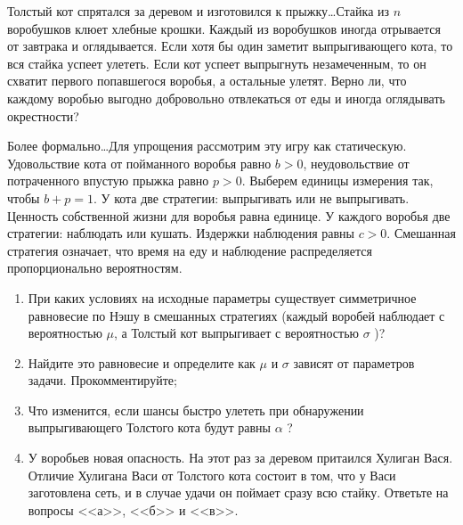 \begin{problem}
Толстый кот спрятался за деревом и изготовился к прыжку\ldots Стайка из  $n$  воробушков клюет хлебные крошки. Каждый из воробушков иногда отрывается от завтрака и оглядывается. Если хотя бы один заметит выпрыгивающего кота, то вся стайка успеет улететь. Если кот успеет выпрыгнуть незамеченным, то он схватит первого попавшегося воробья, а остальные улетят. Верно ли, что каждому воробью выгодно добровольно отвлекаться от еды и иногда оглядывать окрестности?\par
Более формально\ldots Для упрощения рассмотрим эту игру как статическую. Удовольствие кота от пойманного воробья равно  $b>0$, неудовольствие от потраченного впустую прыжка равно  $p>0$. Выберем единицы измерения так, чтобы  $b+p=1$. У кота две стратегии: выпрыгивать или не выпрыгивать.
Ценность собственной жизни для воробья равна единице. У каждого воробья две стратегии: наблюдать или кушать. Издержки наблюдения равны  $c>0$. Смешанная стратегия означает, что время на еду и наблюдение распределяется пропорционально вероятностям.
\begin{enumerate}
\item  При каких условиях на исходные параметры существует симметричное равновесие по Нэшу в смешанных стратегиях (каждый воробей наблюдает с вероятностью  $\mu $, а Толстый кот выпрыгивает с вероятностью  $\sigma $ )?\par
\item Найдите это равновесие и определите как  $\mu $  и  $\sigma $  зависят от параметров задачи. Прокомментируйте;\par
\item  Что изменится, если шансы быстро улететь при обнаружении выпрыгивающего Толстого кота будут равны  $\alpha$ ?\par
\item У воробьев новая опасность. На этот раз за деревом притаился Хулиган Вася. Отличие Хулигана Васи от Толстого кота состоит в том, что у Васи заготовлена сеть, и в случае удачи он поймает сразу всю стайку. Ответьте на вопросы <<а>>, <<б>> и <<в>>.
\end{enumerate}


\begin{sol}

\end{sol}
\end{problem}



